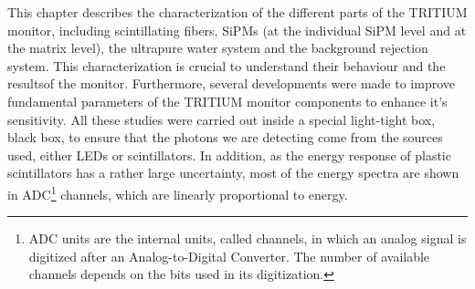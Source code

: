 This chapter describes the characterization of the different parts of the TRITIUM monitor, including scintillating fibers, SiPMs (at the individual SiPM level and at the matrix level), the ultrapure water system and the background rejection system. This characterization is crucial to understand their behaviour and the resultsof the monitor. Furthermore, several developments were made  to improve fundamental parameters of the TRITIUM monitor components to enhance it's sensitivity. All these studies were carried out inside a special light-tight box, black box, to ensure that the photons we are detecting come from the sources used, either LEDs or scintillators. In addition, as the energy response of plastic scintillators has a rather large uncertainty, most of the energy spectra are shown in ADC\footnote{ADC units are the internal units, called channels, in which an analog signal is digitized after an Analog-to-Digital Converter. The number of available channels depends on the bits used in its digitization.} channels, which are linearly proportional to energy.